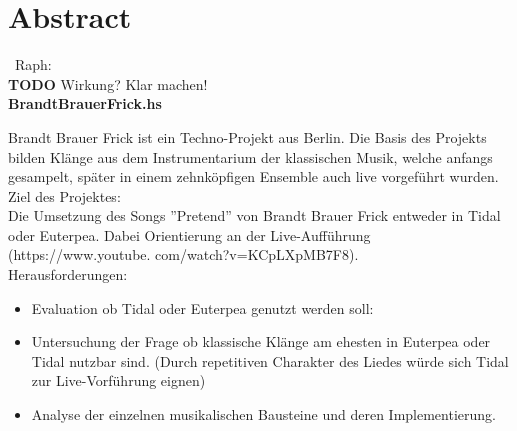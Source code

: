 \documentclass[
10pt, %
a4paper, %
oneside, %
headinclude,footinclude, %
BCOR5mm, %
]{scrartcl}
\begin{document}





\newpage %

\section{Abstract}\
Raph: \\
{\color{red}\textbf{TODO}} Wirkung? Klar machen!\\

\textbf{BrandtBrauerFrick.hs}

\noindent Brandt Brauer Frick ist ein Techno-Projekt aus Berlin.
Die Basis des Projekts bilden Klänge aus dem Instrumentarium der
klassischen Musik, welche anfangs gesampelt, später in einem zehnköpfigen
Ensemble auch live vorgeführt wurden.\cite{Wiki}\\ 

\noindent Ziel des Projektes:\\
Die Umsetzung des Songs ''Pretend'' von Brandt Brauer Frick entweder in
Tidal oder Euterpea. Dabei Orientierung an der Live-Aufführung
(https://www.youtube. com/watch?v=KCpLXpMB7F8).\\


\noindent Herausforderungen:
\begin{itemize}
	\item Evaluation ob Tidal oder Euterpea genutzt werden soll:
	\item Untersuchung der Frage ob klassische Klänge am ehesten in Euterpea oder
	Tidal nutzbar sind. (Durch repetitiven Charakter des Liedes würde sich Tidal zur
	Live-Vorführung eignen)
	\item Analyse der einzelnen musikalischen Bausteine und deren Implementierung.
\end{itemize}
\end{document}
